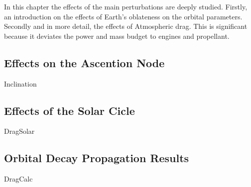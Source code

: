 In this chapter the effects of the main perturbations are deeply studied. Firstly, an introduction on the effects of Earth's oblateness on the orbital parameters. Secondly and in more detail, the effects of Atmospheric drag. This is significant because it deviates the power and mass budget to engines and propellant.

\subsection{Effects on the Ascention Node}
{Inclination}

\subsection{Effects of the Solar Cicle}
{DragSolar}

\subsection{Orbital Decay Propagation Results}
{DragCalc}



